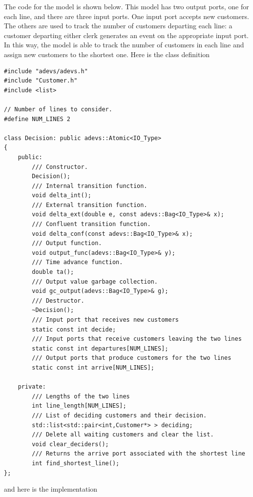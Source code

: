 The code for the  model is shown below. This model has two output ports, one for each line, and there are three input ports. One input port accepts new customers. The others are used to track the number of customers departing each line: a customer departing either clerk generates an event on the appropriate input port. In this way, the model is able to track the number of customers in each line and assign new customers to the shortest one. Here is the class definition
\begin{verbatim}
#include "adevs/adevs.h"
#include "Customer.h"
#include <list>

// Number of lines to consider.
#define NUM_LINES 2

class Decision: public adevs::Atomic<IO_Type>
{
    public:
        /// Constructor.
        Decision();
        /// Internal transition function.
        void delta_int();
        /// External transition function.
        void delta_ext(double e, const adevs::Bag<IO_Type>& x);
        /// Confluent transition function.
        void delta_conf(const adevs::Bag<IO_Type>& x);
        /// Output function.
        void output_func(adevs::Bag<IO_Type>& y);
        /// Time advance function.
        double ta();
        /// Output value garbage collection.
        void gc_output(adevs::Bag<IO_Type>& g);
        /// Destructor.
        ~Decision();
        /// Input port that receives new customers
        static const int decide;
        /// Input ports that receive customers leaving the two lines
        static const int departures[NUM_LINES];
        /// Output ports that produce customers for the two lines
        static const int arrive[NUM_LINES];

    private:
        /// Lengths of the two lines
        int line_length[NUM_LINES];
        /// List of deciding customers and their decision.
        std::list<std::pair<int,Customer*> > deciding;
        /// Delete all waiting customers and clear the list.
        void clear_deciders();
        /// Returns the arrive port associated with the shortest line
        int find_shortest_line();
};
\end{verbatim}
and here is the implementation
